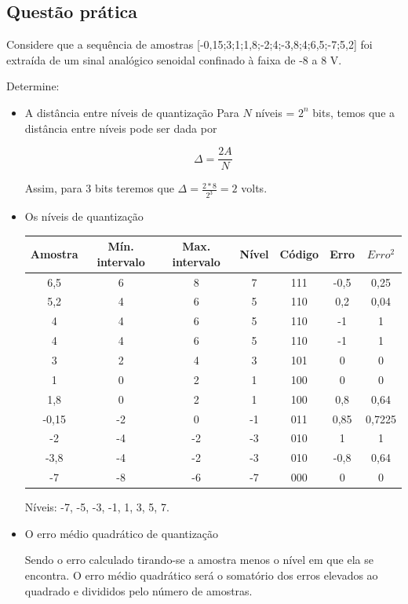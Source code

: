 \documentclass[]{report}
\begin{document}
\subsection{Questão prática}


Considere que a sequência de amostras [-0,15;3;1;1,8;-2;4;-3,8;4;6,5;-7;5,2]  foi extraída de um sinal analógico senoidal confinado à faixa de -8 a 8 V.

Determine:

\begin{itemize}
\item{A distância entre níveis de quantização}\newline
Para $N$ níveis = $2^n$ bits, temos que a distância entre níveis pode ser dada por

\begin{equation}
\Delta = \frac{2 A}{N}
\end{equation}


Assim, para 3 bits teremos que $\Delta = \frac{2*8}{2^3} =  2$  volts.
\item{Os níveis de quantização}

\begin{tabular}{|c|c|c|c|c|c|c|}
\hline Amostra  & Mín. intervalo  & Max. intervalo & Nível & Código  & Erro & $Erro^2$ \\ 
\hline 6,5 & 6 & 8  & 7 & 111 & -0,5 & 0,25 \\ 
\hline 5,2 & 4 & 6  & 5 & 110 & 0,2 & 0,04 \\ 
\hline 4 & 4 & 6  & 5 & 110 & -1 & 1 \\ 
\hline 4 & 4 & 6  & 5 & 110 & -1 & 1 \\ 
\hline 3 & 2 & 4 & 3  & 101  & 0 & 0 \\ 
\hline 1 & 0 & 2 & 1 & 100  &  0 & 0 \\ 
\hline 1,8 & 0 & 2 & 1 & 100 & 0,8 & 0,64 \\ 
\hline -0,15 & -2 & 0 & -1  & 011  & 0,85 & 0,7225 \\ 
\hline -2 & -4 & -2 & -3 & 010  & 1 & 1 \\ 
\hline -3,8 & -4 & -2  & -3  & 010 & -0,8 & 0,64 \\ 
\hline -7 & -8 & -6  &  -7 & 000  & 0 & 0 \\ 
\hline 
\end{tabular} 

Níveis: -7, -5, -3, -1, 1, 3, 5, 7.
\item{O erro médio quadrático de quantização}

Sendo o erro calculado tirando-se a amostra menos o nível em que ela se encontra. O erro médio quadrático será o somatório dos erros elevados ao quadrado e divididos pelo número de amostras.


\end{itemize}
\end{document}
